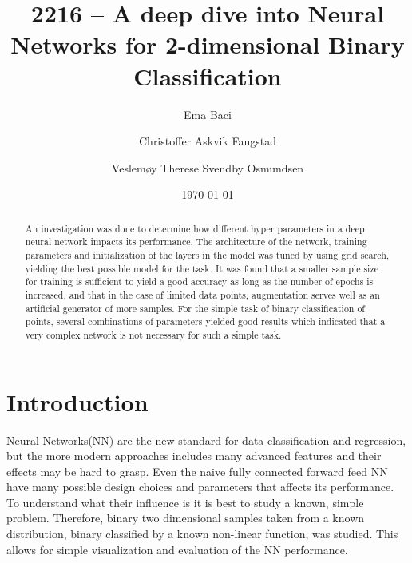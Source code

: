 \documentclass[prl,twocolumn]{revtex4-1}
\begin{document}
\title{2216 -- A deep dive into Neural Networks for 2-dimensional Binary Classification}

\author{Ema Baci}
\author{Christoffer Askvik Faugstad}
\author{Veslemøy Therese Svendby Osmundsen}

\date{\today}

\begin{abstract}
An investigation was done to determine how different hyper parameters in a deep neural network impacts its performance. The architecture of the network, training parameters and initialization of the layers in the model was tuned by using grid search, yielding the best possible model for the task. It was found that a smaller sample size for training is sufficient to yield a good accuracy as long as the number of epochs is increased, and that in the case of limited data points, augmentation serves well as an artificial generator of more samples. For the simple task of binary classification of points, several combinations of parameters yielded good results which indicated that a very complex network is not necessary for such a simple task.

\end{abstract}

\maketitle

\section{Introduction}
Neural Networks(NN) are the new standard for data classification and regression, but the more modern approaches includes many advanced features and their effects may be hard to grasp. Even the naive fully connected forward feed NN have many possible design choices and parameters that affects its performance. To understand what their influence is it is best to study a known, simple problem. Therefore, binary two dimensional samples taken from a known distribution, binary classified by a known non-linear function, was studied. This allows for simple visualization and evaluation of the NN performance.

\end{document}
